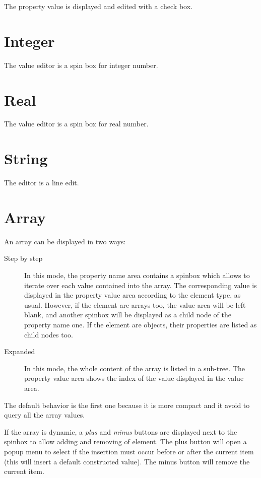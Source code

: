 \documentclass[a4paper, twoside]{report}
\begin{document}
The property value is displayed and edited with a check box.

\section{Integer}

The value editor is a spin box for integer number.

\section{Real}

The value editor is a spin box for real number.

\section{String}

The editor is a line edit.

\section{Array}

An array can be displayed in two ways:
\begin{description}
    \item[Step by step] In this mode, the property name area contains a spinbox which allows to
iterate over each value contained into the array. The corresponding value is displayed in the
property value area according to the element type, as usual. However, if the element are arrays too,
the value area will be left blank, and another spinbox will be displayed as a child node of the
property name one. If the element are objects, their properties are listed as child nodes too.
    \item[Expanded] In this mode, the whole content of the array is listed in a sub-tree. The
property value area shows the index of the value displayed in the value area.
\end{description}

The default behavior is the first one because it is more compact and it avoid to query all the array
values.

If the array is dynamic, a \emph{plus} and \emph{minus} buttons are displayed next to the spinbox to
allow adding and removing of element. The plus button will open a popup menu to select if the
insertion must occur before or after the current item (this will insert a default constructed
value). The minus button will remove the current item.
\end{document}
